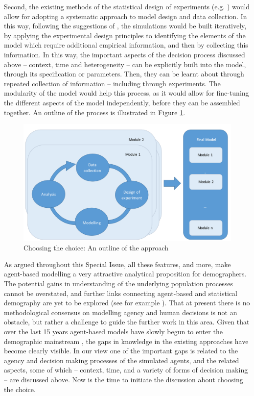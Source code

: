 \documentclass{article}
\begin{document}
Second, the existing methods of the statistical design of experiments (e.g. \citeauthor{Chaloner} \citeyear{Chaloner}) would allow for adopting a systematic approach to model design and data collection. In this way, following the suggestions of \citet{Courgeau}, the simulations would be built iteratively, by applying the experimental design principles to identifying the elements of the model which require additional empirical information, and then by collecting this information.  In this way, the important aspects of the decision process discussed above – context, time and heterogeneity – can be explicitly built into the model, through its specification or parameters. Then, they can be learnt about through repeated collection of information – including through experiments. The modularity of the model would help this process, as it would allow for fine-tuning the different aspects of the model independently, before they can be assembled together. An outline of the process is illustrated in Figure \ref{fig:approach}.

\begin{figure}
\includegraphics[width=\textwidth]{process}
\caption{Choosing the choice: An outline of the approach \label{fig:approach}}
\end{figure}

As argued throughout this Special Issue, all these features, and more, make agent-based modelling a very attractive analytical proposition for demographers. The potential gains in understanding of the underlying population processes cannot be overstated, and further links connecting agent-based and statistical demography are yet to be explored (see for example \citet{Bijak2016}). That at present there is no methodological consensus on modelling agency and human decisions is not an obstacle, but rather a challenge to guide the further work in this area. Given that over the last 15 years agent-based models have slowly begun to enter the demographic mainstream \citep{Billari2003,VanBavel2016}, the gaps in knowledge in the existing approaches have become clearly visible. In our view one of the important gaps is related to the agency and decision making processes of the simulated agents, and the related aspects, some of which – context, time, and a variety of forms of decision making – are discussed above. Now is the time to initiate the discussion about choosing the choice. 



\end{document}
